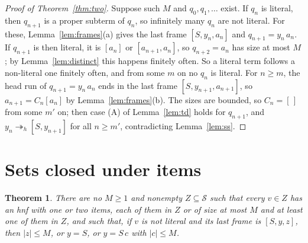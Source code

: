 \documentclass[11pt]{amsart}
\newtheorem{theorem}{Theorem}
\newcommand{\Ter}{\mathcal S}
\newcommand{\hred}{\twoheadrightarrow_h}
\newcommand{\sz}[1]{\lvert#1\rvert}
\newcommand{\fr}[1]{[#1]}
\begin{document}
\begin{proof}[Proof of Theorem~\ref{thm:two}]
Suppose such $M$ and $q_0,q_1,\dots$ exist. If $q_n$ is literal, then $q_{n+1}$ is a proper subterm of $q_n$,
so infinitely many $q_n$ are not literal. For these, Lemma~\ref{lem:frames}(a) gives the last frame
$\fr{S,y_n,a_n}$ and $q_{n+1}=y_n\,a_n$. If $q_{n+1}$ is then literal, it is $\fr{a_n}$ or
$\fr{a_{n+1},a_n}$, so $q_{n+2}=a_n$ has size at most $M$; by Lemma~\ref{lem:distinct} this happens
finitely often. So a literal term follows a non-literal one finitely often, and from some $m$ on
no $q_n$ is literal. For $n\ge m$, the head run of
$q_{n+1}=y_n\,a_n$ ends in the last frame $\fr{S,y_{n+1},a_{n+1}}$, so $a_{n+1}=C_n[a_n]$ by
Lemma~\ref{lem:frames}(b). The sizes are bounded, so $C_n=[\,]$ from some $m'$ on; then case (A) of
Lemma~\ref{lem:td} holds for $q_{n+1}$, and $y_n\hred\fr{S,y_{n+1}}$ for all $n\ge m'$,
contradicting Lemma~\ref{lem:ss}.
\end{proof}

\section{Sets closed under items}\label{sec:sets}

\begin{theorem}\label{thm:xplus}
There are no $M\ge1$ and nonempty $Z\subseteq\Ter$ such that every $v\in Z$ has an hnf with one or
two items, each of them in $Z$ or of size at most $M$ and at least one of them in $Z$, and such
that, if $v$ is not literal and its last frame is $\fr{S,y,z}$, then $\sz z\le M$, or $y=S$, or
$y=S\,c$ with $\sz c\le M$.
\end{theorem}
\end{document}
